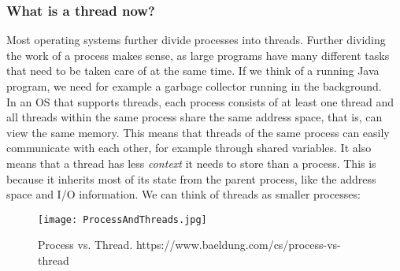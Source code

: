 \documentclass[main]{subfiles}
\begin{document}
\subsubsection{What is a thread now?}
Most operating systems further divide processes into threads. Further dividing the work of a process makes sense, as large programs have many different tasks that need to be taken care of at the same time. If we think of a running Java program, we need for example a garbage collector running in the background. \\[3mm]
In an OS that supports threads, each process consists of at least one thread and all threads within the same process share the same address space, that is, can view the same memory. This means that threads of the same process can easily communicate with each other, for example through shared variables. It also means that a thread has less \textit{context} it needs to store than a process. This is because it inherits most of its state from the parent process, like the address space and I/O information. We can think of threads as smaller processes:
\begin{figure}[H]
    \centering
    \texttt{[image: ProcessAndThreads.jpg]}
    \caption{Process vs. Thread. https://www.baeldung.com/cs/process-vs-thread}
\end{figure}
\end{document}
